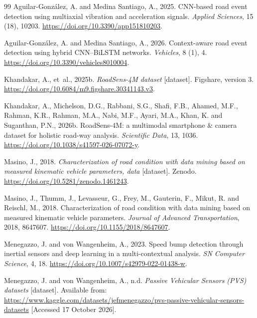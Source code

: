 \begin{thebibliography}{99}
Aguilar-Gonz\'alez, A. and Medina Santiago, A., 2025. CNN-based road event detection using multiaxial vibration and acceleration signals. \emph{Applied Sciences}, 15 (18), 10203. \url{https://doi.org/10.3390/app151810203}.

Aguilar-Gonz\'alez, A. and Medina Santiago, A., 2026. Context-aware road event detection using hybrid CNN--BiLSTM networks. \emph{Vehicles}, 8 (1), 4. \url{https://doi.org/10.3390/vehicles8010004}.

Khandakar, A., et~al., 2025b. \emph{RoadSens-4M dataset} [dataset]. Figshare, version 3. \url{https://doi.org/10.6084/m9.figshare.30341143.v3}.

Khandakar, A., Michelson, D.G., Rabbani, S.G., Shafi, F.B., Ahamed, M.F., Rahman, K.R., Rahman, M.A., Nabi, M.F., Ayari, M.A., Khan, K. and Suganthan, P.N., 2026b. RoadSens-4M: a multimodal smartphone \& camera dataset for holistic road-way analysis. \emph{Scientific Data}, 13, 1036. \url{https://doi.org/10.1038/s41597-026-07072-y}.

Masino, J., 2018. \emph{Characterization of road condition with data mining based on measured kinematic vehicle parameters, data} [dataset]. Zenodo. \url{https://doi.org/10.5281/zenodo.1461243}.

Masino, J., Thumm, J., Levasseur, G., Frey, M., Gauterin, F., Mikut, R. and Reischl, M., 2018. Characterization of road condition with data mining based on measured kinematic vehicle parameters. \emph{Journal of Advanced Transportation}, 2018, 8647607. \url{https://doi.org/10.1155/2018/8647607}.

Menegazzo, J. and von Wangenheim, A., 2023. Speed bump detection through inertial sensors and deep learning in a multi-contextual analysis. \emph{SN Computer Science}, 4, 18. \url{https://doi.org/10.1007/s42979-022-01438-w}.

Menegazzo, J. and von Wangenheim, A., n.d. \emph{Passive Vehicular Sensors (PVS) datasets} [dataset]. Available from: \url{https://www.kaggle.com/datasets/jefmenegazzo/pvs-passive-vehicular-sensors-datasets} [Accessed 17 October 2026].


\end{thebibliography}
